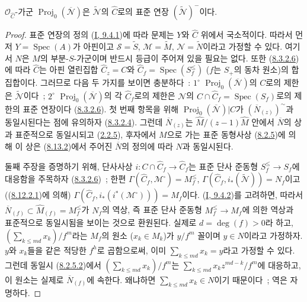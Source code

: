\begin{proposition}[8.13.3]
\label{II.8.13.3-ko}
$\mathcal{O}_{\widehat{C}}$-가군
$\operatorname{Proj}_0(\overline{\mathcal{N}})$은
$\widetilde{\mathcal{N}}$의 $\widehat{C}$로의 표준 연장
$(\widetilde{\mathcal{N}})^{-}$이다.
\end{proposition}

\begin{proof}
표준 연장의 정의 (\hyperref[I.9.4.1-ko]{I, 9.4.1})에 따라 문제는
$Y$와 $\widehat{C}$ 위에서 국소적이다. 따라서 먼저
$Y=\operatorname{Spec}(A)$가 아핀이고
$\mathcal{S}=\widetilde{S}$, $\mathcal{M}=\widetilde{M}$,
$\mathcal{N}=\widetilde{N}$이라고 가정할 수 있다. 여기서 $N$은
$M$의 부분-$S$-가군이며 반드시 등급이 주어져 있을 필요는 없다.
또한 (\hyperref[II.8.3.2.6-ko]{8.3.2.6})에 따라 $\widehat{C}$는
아핀 열린집합 $\widehat{C}_z=C$와
$\widehat{C}_f=\operatorname{Spec}(S_f^{\leq})$
($f$는 $S_+$의 동차 원소)의 합집합이다. 그러므로 다음 두 가지를
보이면 충분하다~: $1^\circ$
$\operatorname{Proj}_0(\overline{\mathcal{N}})$의 $C$로의 제한은
$\widetilde{\mathcal{N}}$이다~; $2^\circ$
$\operatorname{Proj}_0(\overline{\mathcal{N}})$의 각
$\widehat{C}_f$로의 제한은 $\mathcal{N}$의
$C\cap\widehat{C}_f=\operatorname{Spec}(S_f)$로의 제한의 표준
연장이다 (\hyperref[II.8.3.2.6-ko]{8.3.2.6}). 첫 번째 항목을 위해
$\operatorname{Proj}_0(\overline{\mathcal{N}})|C$가
$(\overline{N}_{(z)})^{\sim}$과 동일시된다는 점에 유의하자
(\hyperref[II.8.3.2.4-ko]{8.3.2.4}). 그런데
$\overline{N}_{(z)}$는 $\widehat{M}/(z-1)\widehat{M}$ 안에서
$\overline{N}$의 상과 표준적으로 동일시되고
(\hyperref[II.2.2.5-ko]{2.2.5}), 후자에서 $M$으로 가는 표준
동형사상 (\hyperref[II.8.2.5-ko]{8.2.5})에 의해 이 상은
(\hyperref[II.8.13.2-ko]{8.13.2})에서 주어진
$\overline{N}$의 정의에 따라 $N$과 동일시된다.

둘째 주장을 증명하기 위해, 단사사상
$i:C\cap\widehat{C}_f\to\widehat{C}_f$는 표준 단사 준동형
$S_f^{\leq}\to S_f$에 대응함을 주목하자
(\hyperref[II.8.3.2.6-ko]{8.3.2.6})~; 한편
$\Gamma(\widehat{C}_f,\mathcal{M}^{\square})=M_f^{\leq}$,
$\Gamma(\widehat{C}_f,i_*(\widetilde{\mathcal{N}}))=N_f$이고
((\hyperref[II.8.12.2.1-ko]{8.12.2.1})에 의해)
$\Gamma(\widehat{C}_f,i_*(i^*(\mathcal{M}^{\square})))=M_f$이다.
(\hyperref[I.9.4.2-ko]{I, 9.4.2})를 고려하면, 따라서
$\overline{N}_{(f)}\subset\widehat{M}_{(f)}=M_f^{\leq}$가 $N_f$의 역상,
즉 표준 단사 준동형 $M_f^{\leq}\to M_f$에 의한 역상과 표준적으로
동일시됨을 보이는 것으로 환원된다. 실제로 $d=\deg(f)>0$라 하고,
$(\sum_{k\leqslant md}x_k)/f^m$라는 $M_f$의 원소
($x_k\in M_k$)가 $y/f^m$ 꼴이며 $y\in N$이라고 가정하자.
$y$와 $x_k$들을 같은 적당한 $f^h$로
곱함으로써, 이미 $\sum_{k\leqslant md}x_k=y$라고 가정할 수 있다.
그런데 동일시 (\hyperref[II.8.2.5.2-ko]{8.2.5.2})에서
$(\sum_{k\leqslant md}x_k)/f^m$는
$\sum_{k\leqslant md}x_kz^{md-k}/f^m$에 대응하고, 이 원소는 실제로
$\overline{N}_{(f)}$에 속한다. 왜냐하면
$\sum_{k\leqslant md}x_k\in N$이기 때문이다~; 역은 자명하다.
\end{proof}

